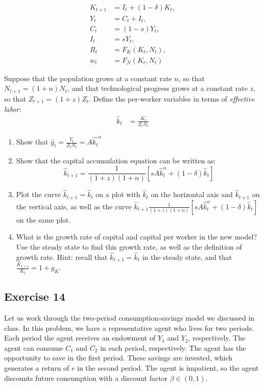 \documentclass[11pt]{article}
\begin{document}
\begin{align*}
    K_{t+1} &= I_t + (1 - \delta)K_t, \\
    Y_t &= C_t + I_t, \\
    C_t &= (1 - s)Y_t, \\
    I_t &= sY_t, \\
    R_t &= F_K(K_t, N_t), \\
    w_t &= F_N(K_t, N_t)
\end{align*}


Suppose that the population grows at a constant rate \(n\), so that \(N_{t+1} = (1 + n)N_t\),
and that technological progress grows at a constant rate \(z\), so that \(Z_{t+1} = (1 + z)Z_t\).
Define the per-worker variables in terms of \textit{effective labor}:
\begin{align*}
    \hat{k}_t   &= \frac{K_t}{Z_tN_t}
\end{align*}

\begin{enumerate}
    \item Show that \(    \hat{y}_t   = \frac{Y_t}{Z_tN_t}   = A\hat{k_t}^\alpha\)
    \item Show that the capital accumulation equation can be written as:
    \[\hat{k}_{t+1} = \frac{1}{(1+z)(1+n)}[sA\hat{k}_t^\alpha + (1 - \delta)\hat{k}_t]\]
    \item Plot the curve \(\hat{k}_{t+1} = \hat{k}_t\) on a plot with \(\hat{k}_t\) on the horizontal axis and \(\hat{k}_{t+1}\) on the vertical axis,
    as well as the curve \(\hat{k}_{t+1} \frac{1}{(1+z)(1+n)}[sA\hat{k}_t^\alpha + (1 - \delta)\hat{k}_t] \) on the same plot.
    \item What is the growth rate of capital and capital per worker 
    in the new model? 
    Use the steady state to find this growth rate, as well as the definition of growth rate.
    Hint: recall that \(\hat{k}_{t+1} = \hat{k}_t\) in the steady state, 
    and that \(\frac{K_{t+1}}{K_t} = 1 + g_K\).
\end{enumerate}

\subsection*{Exercise 14}
Let us work through the two-period consumption-savings model we discussed in class.
In this problem, we have a representative agent who lives for two periods.
Each period the agent receives an endowment of \(Y_1\) and \(Y_2\), respectively.
The agent can consume \(C_1\) and \(C_2\) in each period, respectively.
The agent has the opportunity to save in the first period.
These savings are invested, which generates a return of \(r\) in the second period.
The agent is impatient, so the agent discounts future consumption with a discount factor \(\beta \in (0,1)\).
\end{document}
